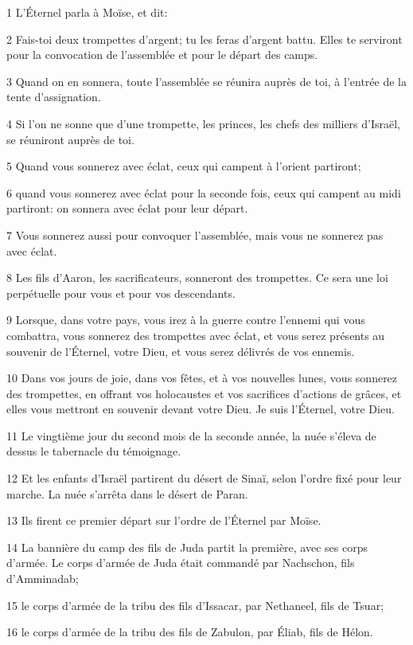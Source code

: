 \par 1 L'Éternel parla à Moïse, et dit:
\par 2 Fais-toi deux trompettes d'argent; tu les feras d'argent battu. Elles te serviront pour la convocation de l'assemblée et pour le départ des camps.
\par 3 Quand on en sonnera, toute l'assemblée se réunira auprès de toi, à l'entrée de la tente d'assignation.
\par 4 Si l'on ne sonne que d'une trompette, les princes, les chefs des milliers d'Israël, se réuniront auprès de toi.
\par 5 Quand vous sonnerez avec éclat, ceux qui campent à l'orient partiront;
\par 6 quand vous sonnerez avec éclat pour la seconde fois, ceux qui campent au midi partiront: on sonnera avec éclat pour leur départ.
\par 7 Vous sonnerez aussi pour convoquer l'assemblée, mais vous ne sonnerez pas avec éclat.
\par 8 Les fils d'Aaron, les sacrificateurs, sonneront des trompettes. Ce sera une loi perpétuelle pour vous et pour vos descendants.
\par 9 Lorsque, dans votre pays, vous irez à la guerre contre l'ennemi qui vous combattra, vous sonnerez des trompettes avec éclat, et vous serez présents au souvenir de l'Éternel, votre Dieu, et vous serez délivrés de vos ennemis.
\par 10 Dans vos jours de joie, dans vos fêtes, et à vos nouvelles lunes, vous sonnerez des trompettes, en offrant vos holocaustes et vos sacrifices d'actions de grâces, et elles vous mettront en souvenir devant votre Dieu. Je suis l'Éternel, votre Dieu.
\par 11 Le vingtième jour du second mois de la seconde année, la nuée s'éleva de dessus le tabernacle du témoignage.
\par 12 Et les enfants d'Israël partirent du désert de Sinaï, selon l'ordre fixé pour leur marche. La nuée s'arrêta dans le désert de Paran.
\par 13 Ils firent ce premier départ sur l'ordre de l'Éternel par Moïse.
\par 14 La bannière du camp des fils de Juda partit la première, avec ses corps d'armée. Le corps d'armée de Juda était commandé par Nachschon, fils d'Amminadab;
\par 15 le corps d'armée de la tribu des fils d'Issacar, par Nethaneel, fils de Tsuar;
\par 16 le corps d'armée de la tribu des fils de Zabulon, par Éliab, fils de Hélon.
